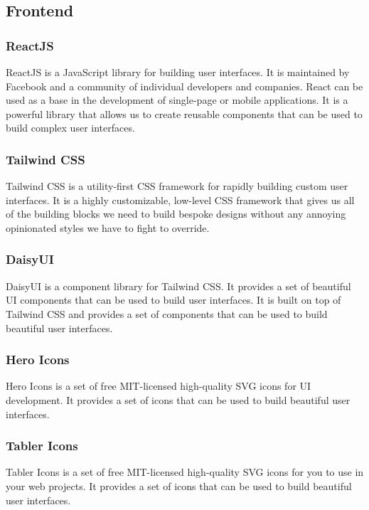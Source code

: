 \documentclass[11pt]{article}
\begin{document}
\subsection{Frontend}
\subsubsection{ReactJS}
ReactJS is a JavaScript library for building user interfaces. It is maintained by Facebook and a community of individual developers and companies. React can be used as a base in the development of single-page or mobile applications. It is a powerful library that allows us to create reusable components that can be used to build complex user interfaces.

\subsubsection{Tailwind CSS}
Tailwind CSS is a utility-first CSS framework for rapidly building custom user interfaces. It is a highly customizable, low-level CSS framework that gives us all of the building blocks we need to build bespoke designs without any annoying opinionated styles we have to fight to override.

\subsubsection{DaisyUI}
DaisyUI is a component library for Tailwind CSS. It provides a set of beautiful UI components that can be used to build user interfaces. It is built on top of Tailwind CSS and provides a set of components that can be used to build beautiful user interfaces.

\subsubsection{Hero Icons}
Hero Icons is a set of free MIT-licensed high-quality SVG icons for UI development. It provides a set of icons that can be used to build beautiful user interfaces.

\subsubsection{Tabler Icons}

Tabler Icons is a set of free MIT-licensed high-quality SVG icons for you to use in your web projects. It provides a set of icons that can be used to build beautiful user interfaces.
\end{document}
